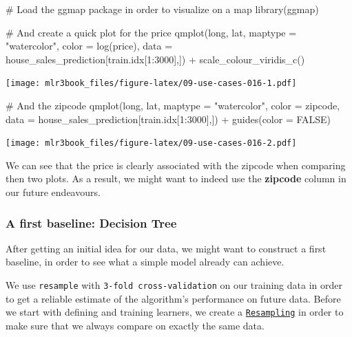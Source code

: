 \documentclass[]{article}
\newenvironment{Shaded}{}{}
\newcommand{\CommentTok}[1]{\textcolor[rgb]{0.00,0.50,0.00}{#1}}
\newcommand{\DataTypeTok}[1]{#1}
\newcommand{\DecValTok}[1]{#1}
\newcommand{\KeywordTok}[1]{\textcolor[rgb]{0.00,0.00,1.00}{#1}}
\newcommand{\NormalTok}[1]{#1}
\newcommand{\OperatorTok}[1]{#1}
\newcommand{\OtherTok}[1]{\textcolor[rgb]{1.00,0.25,0.00}{#1}}
\newcommand{\StringTok}[1]{\textcolor[rgb]{0.00,0.50,0.50}{#1}}
\renewenvironment{Shaded} {\begin{snugshade}\small} {\end{snugshade}}
\begin{document}
\begin{Shaded}
\begin{Highlighting}[]
\CommentTok{# Load the ggmap package in order to visualize on a map}
\KeywordTok{library}\NormalTok{(ggmap)}

\CommentTok{# And create a quick plot for the price}
\KeywordTok{qmplot}\NormalTok{(long, lat, }\DataTypeTok{maptype =} \StringTok{"watercolor"}\NormalTok{, }\DataTypeTok{color =} \KeywordTok{log}\NormalTok{(price),}
  \DataTypeTok{data =}\NormalTok{ house_sales_prediction[train.idx[}\DecValTok{1}\OperatorTok{:}\DecValTok{3000}\NormalTok{],]) }\OperatorTok{+}
\StringTok{  }\KeywordTok{scale_colour_viridis_c}\NormalTok{()}
\end{Highlighting}
\end{Shaded}

\texttt{[image: mlr3book\_files/figure-latex/09-use-cases-016-1.pdf]}

\begin{Shaded}
\begin{Highlighting}[]

\CommentTok{# And the zipcode}
\KeywordTok{qmplot}\NormalTok{(long, lat, }\DataTypeTok{maptype =} \StringTok{"watercolor"}\NormalTok{, }\DataTypeTok{color =}\NormalTok{ zipcode,}
  \DataTypeTok{data =}\NormalTok{ house_sales_prediction[train.idx[}\DecValTok{1}\OperatorTok{:}\DecValTok{3000}\NormalTok{],]) }\OperatorTok{+}\StringTok{ }\KeywordTok{guides}\NormalTok{(}\DataTypeTok{color =} \OtherTok{FALSE}\NormalTok{)}
\end{Highlighting}
\end{Shaded}

\texttt{[image: mlr3book\_files/figure-latex/09-use-cases-016-2.pdf]}

We can see that the price is clearly associated with the zipcode when comparing then two plots.
As a result, we might want to indeed use the \textbf{zipcode} column in our future endeavours.

\hypertarget{a-first-baseline-decision-tree}{%
\subsubsection{A first baseline: Decision Tree}\label{a-first-baseline-decision-tree}}

After getting an initial idea for our data, we might want to construct a first baseline, in order to see what a simple model already can achieve.

We use \texttt{resample} with \texttt{3-fold\ cross-validation} on our training data in order to get a reliable estimate of the algorithm's performance on future data.
Before we start with defining and training learners, we create a \href{https://mlr3.mlr-org.com/reference/Resampling.html}{\texttt{Resampling}} in order to make sure that we always compare on exactly the same data.
\end{document}
